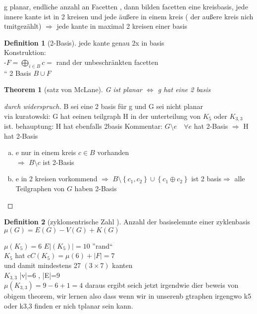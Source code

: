 \documentclass[a4paper]{article}
\newtheorem{theorem}{Theorem}[section]
\theoremstyle{definition}
\newtheorem*{definition}{Definition}
\theoremstyle{remark}
\begin{document}
g planar, endliche anzahl an Facetten , dann bilden facetten eine kreisbasis, jede innere kante ist in 2 kreisen und jede äußere in einem kreis ( der außere kreis nich tmitgezählt)
$\Rightarrow $ jede kante in maximal 2 kreisen einer basis\\
\begin{definition}
  [2-Basis]	
  jede kante genau 2x in basis \\
  Konstruktion:\\
  -$F=\bigoplus_{i\in B} c=$ rand der unbeschränkten facetten\\
  `` 2 Basis $B\cup F$ 
\end{definition}
 \begin{theorem}
   [satz von McLane]
   G ist planar $\Leftrightarrow$ g hat eine 2 basis
 \end{theorem}
\begin{proof}
  [durch widerspruch]
  B sei eine 2 basis für g und G sei nicht planar\\
  via kuratowski: G hat eeinen teilgraph H in der unterteilung von $K_5$  oder $K_{3,3}$ ist.
  behauptung: H hat ebenfalls 2basis
  Kommentar: $G\setminus e \quad \forall e$ hat 2-Basis $\Rightarrow$ H hat 2-Basis
  \begin{enumerate}[(a)]
    \item e nur in einem kreis $c\in B$ vorhanden \\
      $\Rightarrow$ $B\setminus c$ ist 2-Basis
    \item e in 2 kreisen vorkommend $\Rightarrow$ $B\setminus \left\{ c_1,c_2 \right\}\cup \left\{ c_1\oplus c_2 \right\} $ ist 2 basis$\Rightarrow$ alle Teilgraphen von $G$ haben 2-Basis
  \end{enumerate}
\end{proof}

\begin{definition}
  [zyklomentrische Zahl ]
  Anzahl der basiselemnte einer zyklenbasis\\
  $\mu(G)=E(G)-V(G)+K(G)$
\end{definition}

$\mu(K_5)=6$ $ E|(K_5)|=10$ ''rand``\\
$ K_5$ hat c$C(K_5) =\mu(6)+|F|=7$\\
und damit mindestens 27 $(3\times 7) $ kanten\\
$K_{3,3}$ |v|=6 , |E|=9 \\
$\mu(K_{3,3})=9-6+1=4$
daraus ergibt seich jetzt irgendwie dier beweis von obigem theorem, wir lernen also dass wenn wir in unserenb gtraphen irgengwo k5 oder k3,3 finden er nich tplanar sein kann.
\end{document}
